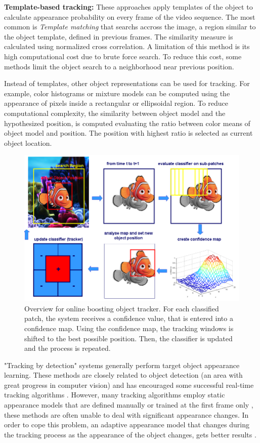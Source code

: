 \textbf{Template-based tracking:}  These approaches apply templates of the
object to calculate appearance probability on every frame of the
video sequence. The most common is \textit{Template matching} \cite{Korman2013}
that searchs accross the image, a region similar to the object template, defined
in previous frames. The similarity measure is calculated using normalized cross
correlation. A limitation of this method is its high computational cost due to
brute force search. To reduce this cost, some methods limit the object search
to a neighborhood near previous position.

Instead of templates, other object representations can be used for tracking.
For example, color histograms or mixture models can be computed using the
appearance of pixels inside a rectangular or ellipsoidal region. To reduce
computational complexity, the similarity between object model and the
hypothesized position, is computed evaluating the ratio between color means of
object model and position. The position with highest ratio is selected as
current object location.

\begin{figure}[t]
	\centering
		\includegraphics[width=0.7\linewidth]{Figures/overview_boost.png}
	\caption[Overview for online boosting object tracker]
	{Overview for online boosting object tracker. For each classified patch,
	the system receives a confidence value, that is entered into a 
	confidence map. Using the confidence map, the tracking windows is
	shifted to the best possible position. Then, the classifier is updated and
	the	process is repeated.}
	\label{fig::overview_boost}
\end{figure}	

"Tracking by detection" \cite{Mori2006} systems generally perform target object
appearance learning. These methods are closely related to object detection
(an area with great progress in computer vision) and has encouraged some
successful real-time tracking algorithms \cite{Liu2007,Grabner2006}. However,
many tracking algorithms employ static appearance models that are defined
manually or trained at the first frame only \cite{Isard2001, Lepetit2006,
Black1996, Comaniciu2000, Adam2006}, these methods are often unable to deal
with significant appearance changes. In order to cope this problem, an adaptive
appearance model that changes during the tracking process as the appearance of
the object changes, gets better results \cite{Ross2007,Matthews2004,Jepson2003}.

